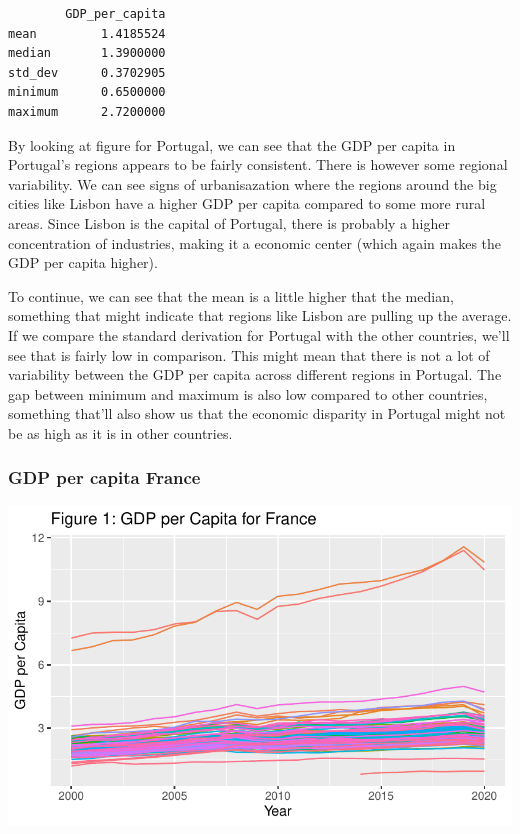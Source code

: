 \documentclass[
  a4paper,
  DIV=11,
  numbers=noendperiod]{scrartcl}
\begin{document}
\begin{verbatim}
        GDP_per_capita
mean         1.4185524
median       1.3900000
std_dev      0.3702905
minimum      0.6500000
maximum      2.7200000
\end{verbatim}

By looking at figure for Portugal, we can see that the GDP per capita in
Portugal's regions appears to be fairly consistent. There is however
some regional variability. We can see signs of urbanisazation where the
regions around the big cities like Lisbon have a higher GDP per capita
compared to some more rural areas. Since Lisbon is the capital of
Portugal, there is probably a higher concentration of industries, making
it a economic center (which again makes the GDP per capita higher).

To continue, we can see that the mean is a little higher that the
median, something that might indicate that regions like Lisbon are
pulling up the average. If we compare the standard derivation for
Portugal with the other countries, we'll see that is fairly low in
comparison. This might mean that there is not a lot of variability
between the GDP per capita across different regions in Portugal. The gap
between minimum and maximum is also low compared to other countries,
something that'll also show us that the economic disparity in Portugal
might not be as high as it is in other countries.

\hypertarget{gdp-per-capita-france}{%
\subsubsection{GDP per capita France}\label{gdp-per-capita-france}}

\includegraphics{MSB104_GR_1_Final_Assignment_research_article_files/figure-pdf/unnamed-chunk-10-1.pdf}
\end{document}
